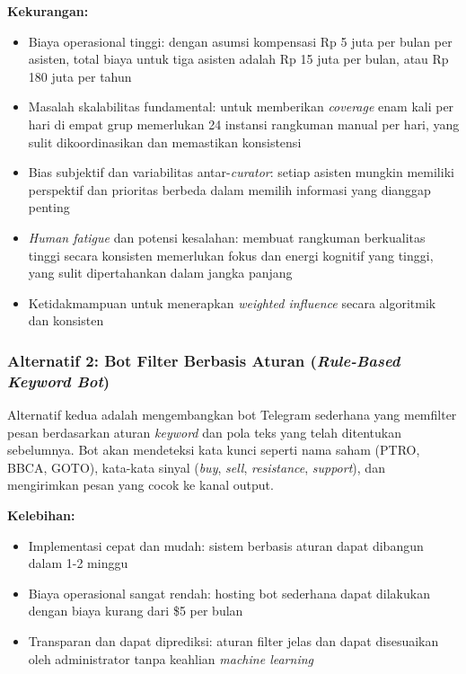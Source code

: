 \textbf{Kekurangan:}
\begin{itemize}
\item Biaya operasional tinggi: dengan asumsi kompensasi Rp 5 juta per bulan per asisten, total biaya untuk tiga asisten adalah Rp 15 juta per bulan, atau Rp 180 juta per tahun
\item Masalah skalabilitas fundamental: untuk memberikan \textit{coverage} enam kali per hari di empat grup memerlukan 24 instansi rangkuman manual per hari, yang sulit dikoordinasikan dan memastikan konsistensi
\item Bias subjektif dan variabilitas antar-\textit{curator}: setiap asisten mungkin memiliki perspektif dan prioritas berbeda dalam memilih informasi yang dianggap penting
\item \textit{Human fatigue} dan potensi kesalahan: membuat rangkuman berkualitas tinggi secara konsisten memerlukan fokus dan energi kognitif yang tinggi, yang sulit dipertahankan dalam jangka panjang
\item Ketidakmampuan untuk menerapkan \textit{weighted influence} secara algoritmik dan konsisten
\end{itemize}

\subsubsection{Alternatif 2: Bot Filter Berbasis Aturan (\textit{Rule-Based Keyword Bot})}

Alternatif kedua adalah mengembangkan bot Telegram sederhana yang memfilter pesan berdasarkan aturan \textit{keyword} dan pola teks yang telah ditentukan sebelumnya. Bot akan mendeteksi kata kunci seperti nama saham (PTRO, BBCA, GOTO), kata-kata sinyal (\textit{buy}, \textit{sell}, \textit{resistance}, \textit{support}), dan mengirimkan pesan yang cocok ke kanal output.

\textbf{Kelebihan:}
\begin{itemize}
\item Implementasi cepat dan mudah: sistem berbasis aturan dapat dibangun dalam 1-2 minggu
\item Biaya operasional sangat rendah: hosting bot sederhana dapat dilakukan dengan biaya kurang dari \$5 per bulan
\item Transparan dan dapat diprediksi: aturan filter jelas dan dapat disesuaikan oleh administrator tanpa keahlian \textit{machine learning}
\end{itemize}

